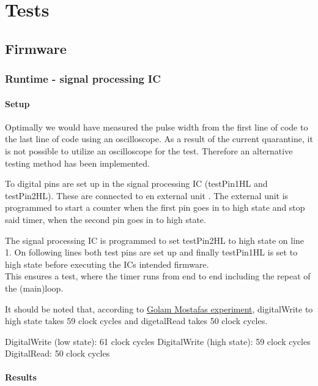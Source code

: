 \chapter{Tests}

\section{Firmware}

\subsection{Runtime - signal processing IC}

\subsubsection{Setup}
Optimally we would have measured the pulse width from the first line of code to the last line of code using an oscilloscope. As a result of the current quarantine, it is not possible to utilize an oscilloscope for the test. Therefore an alternative testing method has been implemented.

To digital pins are set up in the signal processing IC (testPin1HL and testPin2HL). These are connected to en external unit . The external unit is programmed to start a counter when the first pin goes in to high state and stop said timer, when the second pin goes in to high state.

The signal processing IC is programmed to set testPin2HL to high state on line 1. On following lines both test pins are set up and finally testPin1HL is set to high state before executing the ICs intended firmware.\\
This ensures a test, where the timer runs from end to end including the repeat of the (main)loop.

It should be noted that, according to \hyperlink{AppA}{Golam Mostafas experiment}, digitalWrite to high state takes 59 clock cycles and digetalRead takes 50 clock cycles.


DigitalWrite (low state): 61 clock cycles
DigitalWrite (high state): 59 clock cycles
DigitalRead: 50 clock cycles




\subsubsection{Results}

